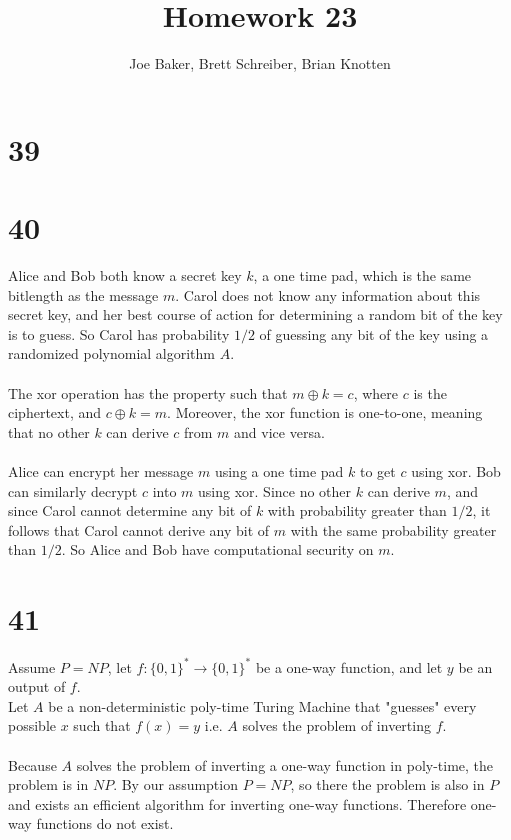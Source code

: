 \documentclass[letterpaper,notitlepage,twoside]{article}
\begin{document}
\title{Homework 23}
\author{Joe Baker, Brett Schreiber, Brian Knotten}
\maketitle

\section*{39}

\section*{40}
Alice and Bob both know a secret key $k$, a one time pad, which is the same bitlength as the message $m$.
Carol does not know any information about this secret key, and her best course of action for determining a random bit of the key is to guess.
So Carol has probability $1/2$ of guessing any bit of the key using a randomized polynomial algorithm $A$. \\\\
The xor operation has the property such that $m \oplus k = c$, where $c$ is the ciphertext, and $c \oplus k = m$. Moreover, the xor function is one-to-one, meaning that no other $k$ can derive $c$ from $m$ and vice versa. \\\\
Alice can encrypt her message $m$ using a one time pad $k$ to get $c$ using xor. Bob can similarly decrypt $c$ into $m$ using xor.
Since no other $k$ can derive $m$, and since Carol cannot determine any bit of $k$ with probability greater than $1/2$, it follows that Carol cannot derive any bit of $m$ with the same probability greater than $1/2$.
So Alice and Bob have computational security on $m$.

\section*{41}
Assume $P=NP$, let $f:\{0,1\}^{*} \rightarrow \{0,1\}^{*}$ be a one-way function, and let $y$ be an output of $f$. \\
Let $A$ be a non-deterministic poly-time Turing Machine that "guesses" every possible $x$ such that $f(x) = y$ i.e. 
$A$ solves the problem of inverting $f$. \\ \\
Because $A$ solves the problem of inverting a one-way function in poly-time, the problem is in $NP$.
By our assumption $P=NP$, so there the problem is also in $P$ and exists an efficient algorithm for inverting one-way functions.
Therefore one-way functions do not exist.
\end{document}

